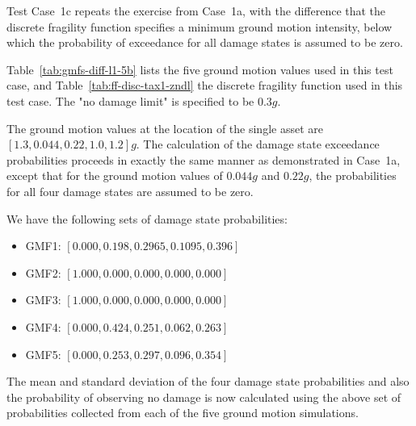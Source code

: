 Test Case~1c repeats the exercise from Case~1a, with the difference that the discrete fragility function specifies a minimum ground motion intensity, below which the probability of exceedance for all damage states is assumed to be zero.



Table~\ref{tab:gmfs-diff-l1-5b} lists the five ground motion values used in this test case, and Table~\ref{tab:ff-disc-tax1-zndl} the discrete fragility function used in this test case. The "no damage limit" is specified to be $0.3 g$.

The ground motion values at the location of the single asset are $[1.3, 0.044, 0.22, 1.0, 1.2] g$. The calculation of the damage state exceedance probabilities proceeds in exactly the same manner as demonstrated in Case~1a, except that for the ground motion values of $0.044 g$ and $0.22 g$, the probabilities for all four damage states are assumed to be zero.

We have the following sets of damage state probabilities:

\begin{itemize}
	\item GMF1: $[0.000, 0.198, 0.2965, 0.1095, 0.396]$
	\item GMF2: $[1.000, 0.000, 0.000, 0.000, 0.000]$
	\item GMF3: $[1.000, 0.000, 0.000, 0.000, 0.000]$
	\item GMF4: $[0.000, 0.424, 0.251, 0.062, 0.263]$
	\item GMF5: $[0.000, 0.253, 0.297, 0.096, 0.354]$
\end{itemize}

The mean and standard deviation of the four damage state probabilities and also the probability of observing no damage is now calculated using the above set of probabilities collected from each of the five ground motion simulations.